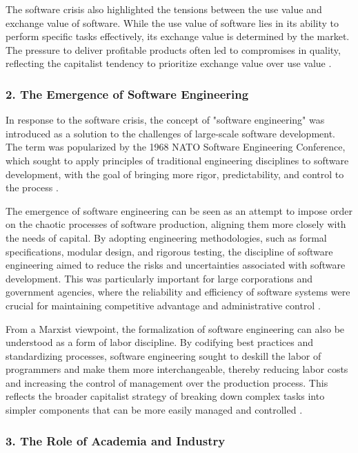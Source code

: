 \begin{refsection}
\begin{multicols}{2}
{The software crisis also highlighted the tensions between the use value and exchange value of software. While the use value of software lies in its ability to perform specific tasks effectively, its exchange value is determined by the market. The pressure to deliver profitable products often led to compromises in quality, reflecting the capitalist tendency to prioritize exchange value over use value \cite{marx1867capital}.

\subsubsection*{2. The Emergence of Software Engineering}

In response to the software crisis, the concept of "software engineering" was introduced as a solution to the challenges of large-scale software development. The term was popularized by the 1968 NATO Software Engineering Conference, which sought to apply principles of traditional engineering disciplines to software development, with the goal of bringing more rigor, predictability, and control to the process \cite{nato1969software}.

The emergence of software engineering can be seen as an attempt to impose order on the chaotic processes of software production, aligning them more closely with the needs of capital. By adopting engineering methodologies, such as formal specifications, modular design, and rigorous testing, the discipline of software engineering aimed to reduce the risks and uncertainties associated with software development. This was particularly important for large corporations and government agencies, where the reliability and efficiency of software systems were crucial for maintaining competitive advantage and administrative control \cite{fuchs2014digital}.

From a Marxist viewpoint, the formalization of software engineering can also be understood as a form of labor discipline. By codifying best practices and standardizing processes, software engineering sought to deskill the labor of programmers and make them more interchangeable, thereby reducing labor costs and increasing the control of management over the production process. This reflects the broader capitalist strategy of breaking down complex tasks into simpler components that can be more easily managed and controlled \cite{braverman1974labor}.

\subsubsection*{3. The Role of Academia and Industry}

}
\end{multicols}
\end{refsection}
